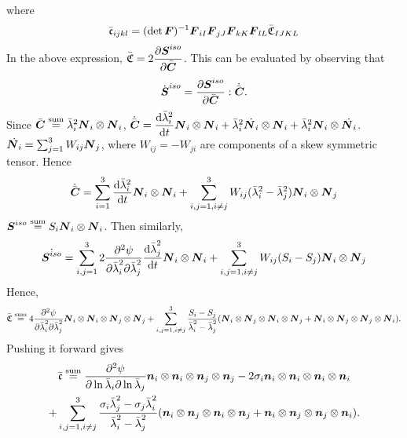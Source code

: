 \documentclass[11pt,twoside,TimesRoman]{article}
\newcommand{\parder}[2]{{\dfrac{\partial #1}{\partial #2}}}
\newcommand{\totder}[2]{{\dfrac{\mathrm{d} #1}{\mathrm{d}#2}}}
\begin{document}
where 
\begin{equation}
	\bar{\mathfrak{c}}_{ijkl} = (\det \mbox{\boldmath $F$})^{-1} \mbox{\boldmath $F$}_{iI} \mbox{\boldmath $F$}_{jJ} \mbox{\boldmath $F$}_{kK} \mbox{\boldmath $F$}_{lL} \bar{\mathfrak{C}}_{IJKL}
\end{equation}
In the above expression, $\bar{\mathfrak{C}} = 2\parder{\bfS^{iso}}{\bfCbar}$. This can be evaluated by observing that
\begin{equation}
	\dot{\bfS}^{iso} = \parder{\bfS^{iso}}{\bfCbar}:  \dot{\bfCbar}.
\end{equation}
Since $\bar{\mbox{\boldmath $C$}} \stackrel{\text{sum}}{=}\bar{\lambda}_i^2 \mbox{\boldmath $N$}_i \otimes \mbox{\boldmath $N$}_i$, $\dot{\bfCbar} = \totder{{\bar{\lambda}_i^2}}{t}  \bfN_i \otimes \bfN_i + \bar{\lambda}_i^2 \dot{\bfN_i} \otimes \bfN_i + \bar{\lambda}_i^2 \bfN_i \otimes \dot{\bfN_i} $. $\dot{\mbox{\boldmath $N$}_i} = \sum_{j=1}^{3} W_{ij} \mbox{\boldmath $N$}_j$, where $W_{ij} = -W_{ji}$ are components of a skew symmetric tensor. Hence 
\begin{equation}
	\dot{\bfCbar} = \sum_{i=1}^{3}\totder{{\bar{\lambda}_i^2}}{t}  \bfN_i \otimes \bfN_i + \sum_{i,j=1, i\neq j}^{3}W_{ij}({\bar{\lambda}_i^2}-{\bar{\lambda}_j^2}) \bfN_i \otimes \bfN_j
\end{equation}
$\mbox{\boldmath $S$}^{iso} \stackrel{\text{sum}}{=} S_i \mbox{\boldmath $N$}_i \otimes \mbox{\boldmath $N$}_i $. Then similarly,
\begin{equation}
	\dot{\bfS^{iso}} = \sum_{i,j=1}^{3}2\parder{^2\psi}{\lambdabar_i^2 \partial \lambdabar_j^2} \totder{\lambdabar_j^2}{t} \bfN_i \otimes \bfN_i + \sum_{i,j=1, i\neq j}^{3}W_{ij}(S_i-S_j) \bfN_i \otimes \bfN_j
\end{equation}
Hence, 
\begin{equation}
	\bar{\mathfrak{C}} \stackrel{\text{sum}}{=} 4 \parder{^2\psi}{\lambdabar_i^2 \partial \lambdabar_j^2} \bfN_i \otimes \bfN_i \otimes \bfN_j \otimes \bfN_j + \sum_{i,j=1, i\neq j}^{3} \frac{S_i-S_j}{\lambdabar_i^2 - \lambdabar_j^2}(\bfN_i \otimes \bfN_j \otimes \bfN_i \otimes \bfN_j + \bfN_i \otimes \bfN_j \otimes \bfN_j \otimes \bfN_i).
\end{equation}
Pushing it forward gives
\begin{multline}
\bar{\mathfrak{c}} \stackrel{\text{sum}}{=} \parder{^2\psi}{\ln \lambdabar_i \partial \ln \lambdabar_j} \bfn_i \otimes \bfn_i \otimes \bfn_j \otimes \bfn_j - 2\sigma_i \bfn_i \otimes \bfn_i \otimes \bfn_i \otimes \bfn_i\\
+ \sum_{i,j=1, i\neq j}^{3} \frac{\sigma_i \lambdabar_j^2 -\sigma_j \lambdabar_i^2}{\lambdabar_i^2 - \lambdabar_j^2}(\bfn_i \otimes \bfn_j \otimes \bfn_i \otimes \bfn_j + \bfn_i \otimes \bfn_j \otimes \bfn_j \otimes \bfn_i).
\end{multline}
\end{document}
